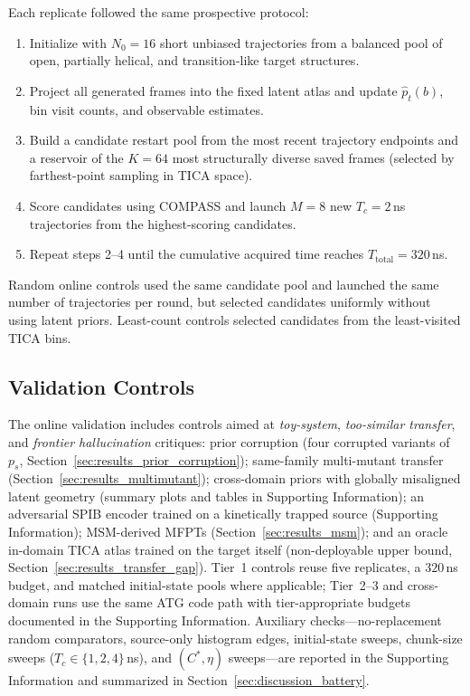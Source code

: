 \documentclass[journal=jctcce,manuscript=article,layout=twocolumn]{achemso}
\begin{document}
Each replicate followed the same prospective protocol:
\begin{enumerate}
    \item Initialize with $N_0=16$ short unbiased trajectories from a balanced pool of open, partially helical, and transition-like target structures.
    \item Project all generated frames into the fixed latent atlas and update $\hat{p}_t(b)$, bin visit counts, and observable estimates.
    \item Build a candidate restart pool from the most recent trajectory endpoints and a reservoir of the $K=64$ most structurally diverse saved frames (selected by farthest-point sampling in TICA space).
    \item Score candidates using COMPASS and launch $M=8$ new $T_c=2$\,ns trajectories from the highest-scoring candidates.
    \item Repeat steps 2--4 until the cumulative acquired time reaches $T_{\mathrm{total}}=320$\,ns.
\end{enumerate}
Random online controls used the same candidate pool and launched the same number of trajectories per round, but selected candidates uniformly without using latent priors. Least-count controls selected candidates from the least-visited TICA bins.

\subsection{Validation Controls}

The online validation includes controls aimed at \emph{toy-system}, \emph{too-similar transfer}, and \emph{frontier hallucination} critiques: prior corruption (four corrupted variants of $p_s$, Section~\ref{sec:results_prior_corruption}); same-family multi-mutant transfer (Section~\ref{sec:results_multimutant}); cross-domain priors with globally misaligned latent geometry (summary plots and tables in Supporting Information); an adversarial SPIB encoder trained on a kinetically trapped source (Supporting Information); MSM-derived MFPTs (Section~\ref{sec:results_msm}); and an oracle in-domain TICA atlas trained on the target itself (non-deployable upper bound, Section~\ref{sec:results_transfer_gap}). Tier~1 controls reuse five replicates, a $320$\,ns budget, and matched initial-state pools where applicable; Tier~2--3 and cross-domain runs use the same ATG code path with tier-appropriate budgets documented in the Supporting Information. Auxiliary checks---no-replacement random comparators, source-only histogram edges, initial-state sweeps, chunk-size sweeps ($T_c\in\{1,2,4\}$\,ns), and $(C^*,\eta)$ sweeps---are reported in the Supporting Information and summarized in Section~\ref{sec:discussion_battery}.
\end{document}
